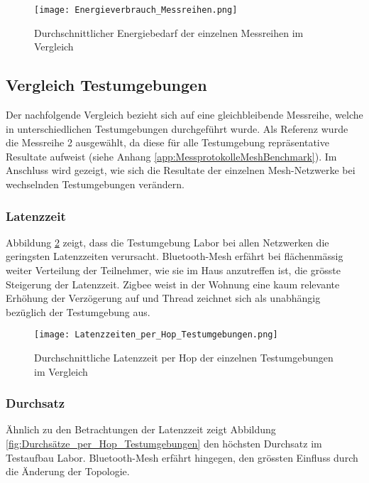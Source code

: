 \begin{figure}[H]
	\centering
	\texttt{[image: Energieverbrauch\_Messreihen.png]}
	\caption{Durchschnittlicher Energiebedarf der einzelnen Messreihen im Vergleich}\label{fig:EnergieverbrauchMessreihen}
\end{figure}


\subsection{Vergleich Testumgebungen}\label{subsec:VergleichTestumgebungen}

Der nachfolgende Vergleich bezieht sich auf eine gleichbleibende Messreihe, welche in unterschiedlichen Testumgebungen durchgeführt wurde.
Als Referenz wurde die Messreihe 2 ausgewählt, da diese für alle Testumgebung repräsentative Resultate aufweist (siehe Anhang \ref{app:MessprotokolleMeshBenchmark}).
Im Anschluss wird gezeigt, wie sich die Resultate der einzelnen Mesh-Netzwerke bei wechselnden Testumgebungen verändern.

\subsubsection{Latenzzeit}\label{subsec:VergleichLatenzzeitTestumgebungen}
Abbildung \ref{fig:Latenzzeiten_per_Hop_Testumgebungen} zeigt, dass die Testumgebung Labor bei allen Netzwerken die geringsten Latenzzeiten verursacht.
Bluetooth-Mesh erfährt bei flächenmässig weiter Verteilung der Teilnehmer, wie sie im Haus anzutreffen ist, die grösste Steigerung der Latenzzeit. Zigbee weist in der Wohnung eine kaum relevante Erhöhung der Verzögerung auf und Thread zeichnet sich als unabhängig bezüglich der Testumgebung aus. 

\begin{figure}[H]
	\centering
	\texttt{[image: Latenzzeiten\_per\_Hop\_Testumgebungen.png]}
	\caption{Durchschnittliche Latenzzeit per Hop der einzelnen Testumgebungen im Vergleich}\label{fig:Latenzzeiten_per_Hop_Testumgebungen}
\end{figure}

\subsubsection{Durchsatz}\label{subsec:VergleichDurchsatzTestumgebungen}
Ähnlich zu den Betrachtungen der Latenzzeit zeigt Abbildung \ref{fig:Durchsätze_per_Hop_Testumgebungen} den höchsten Durchsatz im Testaufbau Labor.
Bluetooth-Mesh erfährt hingegen, den grössten Einfluss durch die Änderung der Topologie. 

